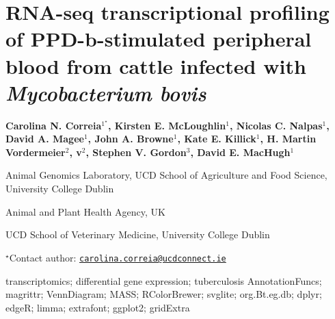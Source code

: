 \documentclass[\main/boa.tex]{subfiles}
\begin{document}
\section{RNA-seq transcriptional profiling of PPD-b-stimulated peripheral blood
from cattle infected with \emph{Mycobacterium bovis}}

\begin{center}
  {\bf {} Carolina N. Correia$^{1^\star}$,  Kirsten E. McLoughlin$^{1}$,  Nicolas C. Nalpas$^{1}$,  David A. Magee$^{1}$,  John A. Browne$^{1}$,  Kate E. Killick$^{1}$,  H. Martin Vordermeier$^{2}$,  v$^{2}$,  Stephen V. Gordon$^{3}$,  David E. MacHugh$^{1}$}
\end{center}

\vskip 0.3cm

\begin{affiliations}
\begin{enumerate}
\begin{minipage}{0.915\textwidth}
\centering
\item Animal Genomics Laboratory, UCD School of Agriculture and Food Science,
University College Dublin \\[-2pt]
\item Animal and Plant Health Agency, UK \\[-2pt]
\item UCD School of Veterinary Medicine, University College Dublin \\[-2pt]
\end{minipage}
\end{enumerate}
$^\star$Contact author: \href{mailto:carolina.correia@ucdconnect.ie}{\nolinkurl{carolina.correia@ucdconnect.ie}}\\
\end{affiliations}

\vskip 0.5cm

\begin{minipage}{0.915\textwidth}
\keywords transcriptomics; differential gene expression; tuberculosis
\packages {} AnnotationFuncs;  magrittr;  VennDiagram;  MASS;  RColorBrewer;  svglite;  org.Bt.eg.db;  dplyr;  edgeR;  limma;  extrafont;  ggplot2;  gridExtra
\end{minipage}
\end{document}
